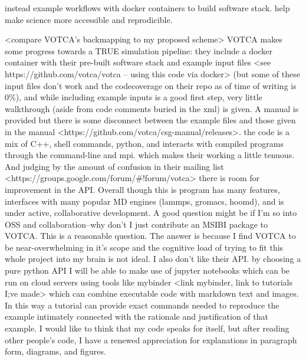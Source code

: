 instead example workflows with docker containers to build software stack.
help make science more accessible and reprodicible.

<compare VOTCA's backmapping to my proposed scheme>
VOTCA makes some progress towards a TRUE simulation pipeline: they include a docker container with their pre-built software stack and example input files <see https://github.com/votca/votca -- using this code via docker> (but some of these input files don't work and the codecoverage on their repo as of time of writing is 0\%), and while including example inputs is a good first step, very little walkthrough (aside from code comments buried in the xml) is given.
A manual is provided but there is some disconnect between the example files and those given in the manual <https://github.com/votca/csg-manual/releases>.
the code is a mix of C++, shell commands, python, and interacts with compiled programs through the command-line and mpi.
which makes their working a little tenuous.
And judging by the amount of confusion in their mailing list <https://groups.google.com/forum/#!forum/votca> there is room for improvement in the API.
Overall though this is program has many features, interfaces with many popular MD engines (lammps, gromacs, hoomd), and is under active, collaborative development.
A good question might be if I'm so into OSS and collaboration--why don't I just contribute an MSIBI package to VOTCA.
This is a reasonable question.
The answer is because I find VOTCA to be near-overwhelming in it's scope and the cognitive load of trying to fit this whole project into my brain is not ideal.
I also don't like their API.
by choosing a pure python API I will be able to make use of jupyter notebooks which can be run on cloud servers using tools like mybinder <link mybinder, link to tutorials I;ve made> which can combine executable code with markdown text and images.
In this way a tutorial can provide exact commands needed to reproduce the example intimately connected with the rationale and justification of that example.
I would like to think that my code speaks for itself, but after reading other people's code, I have a renewed appreciation for explanations in paragraph form, diagrams, and figures.

